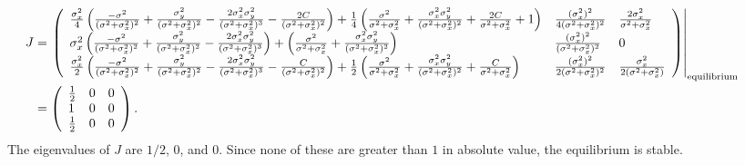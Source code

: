 \documentclass{article}
\begin{document}
\begin{enumerate}
\begin{align*}
\hspace{-60pt}J&=\left.\left(\begin{array}{lll} 
\frac{\sigma_x^2}{4}\left(\frac{-\sigma^2}{(\sigma^2+\sigma_x^2)^2}+\frac{\sigma_y^2}{(\sigma^2+\sigma_x^2)^2}-\frac{2\sigma_x^2\sigma_y^2}{(\sigma^2+\sigma_x^2)^3}-\frac{2C}{(\sigma^2+\sigma_x^2)^2}\right)+\frac{1}{4}\left(\frac{\sigma^2}{\sigma^2+\sigma_x^2}+\frac{\sigma_x^2\sigma_y^2}{(\sigma^2+\sigma_x^2)^2}+\frac{2C}{\sigma^2+\sigma_x^2}+1\right) & \frac{(\sigma_x^2)^2}{4(\sigma^2+\sigma_x^2)^2} & \frac{2\sigma_x^2}{\sigma^2+\sigma_x^2}
\\ \sigma_x^2\left(\frac{-\sigma^2}{(\sigma^2+\sigma_x^2)^2}+\frac{\sigma_y^2}{(\sigma^2+\sigma_x^2)^2}-\frac{2\sigma_x^2\sigma_y^2}{(\sigma^2+\sigma_x^2)^3}\right)+\left(\frac{\sigma^2}{\sigma^2+\sigma_x^2}+\frac{\sigma_x^2\sigma_y^2}{(\sigma^2+\sigma_x^2)^2}\right) & \frac{(\sigma_x^2)^2}{(\sigma^2+\sigma_x^2)^2} & 0 
\\ \frac{\sigma_x^2}{2}\left(\frac{-\sigma^2}{(\sigma^2+\sigma_x^2)^2}+\frac{\sigma_y^2}{(\sigma^2+\sigma_x^2)^2}-\frac{2\sigma_x^2\sigma_y^2}{(\sigma^2+\sigma_x^2)^3}-\frac{C}{(\sigma^2+\sigma_x^2)^2}\right)+\frac{1}{2}\left(\frac{\sigma^2}{\sigma^2+\sigma_x^2}+\frac{\sigma_x^2\sigma_y^2}{(\sigma^2+\sigma_x^2)^2}+\frac{C}{\sigma^2+\sigma_x^2}\right) & \frac{(\sigma_x^2)^2}{2(\sigma^2+\sigma_x^2)^2} & \frac{\sigma_x^2}{2(\sigma^2+\sigma_x^2)}
\end{array}\right)\right|_\text{equilibrium}
\\\hspace{-20pt}&=\left(\begin{array}{lll} 
\frac{1}{2} & 0 & 0 
\\ 1 & 0 & 0 
\\ \frac{1}{2} & 0 & 0 
\end{array}\right).
\end{align*}
The eigenvalues of $J$ are $1/2$, $0$, and $0$. Since none of these are greater than $1$ in absolute value, the equilibrium is stable.
 



\end{enumerate}
\end{document}
